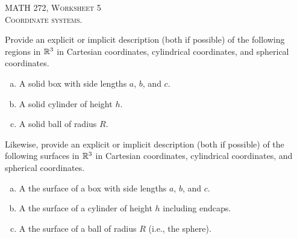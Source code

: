 \documentclass[12pt]{article} %
\begin{document}
\begin{center}
   \textsc{\large MATH 272, Worksheet 5}\\
   \textsc{Coordinate systems.}
\end{center}
\vspace{.5cm}

\begin{problem}
Provide an explicit or implicit description (both if possible) of the following regions in $\mathbb{R}^3$ in Cartesian coordinates, cylindrical coordinates, and spherical coordinates.
    \begin{enumerate}[(a)]
        \item A solid box with side lengths $a$, $b$, and $c$.
        \item A solid cylinder of height $h$.
        \item A solid ball of radius $R$.
    \end{enumerate}
\end{problem}

\vspace*{1cm}
\begin{problem}
Likewise, provide an explicit or implicit description (both if possible) of the following surfaces in $\mathbb{R}^3$ in Cartesian coordinates, cylindrical coordinates, and spherical coordinates.
    \begin{enumerate}[(a)]
        \item A the surface of a box with side lengths $a$, $b$, and $c$.
        \item A the surface of a cylinder of height $h$ including endcaps.
        \item A the surface of a ball of radius $R$ (i.e., the sphere).
    \end{enumerate}
\end{problem}
\end{document}
